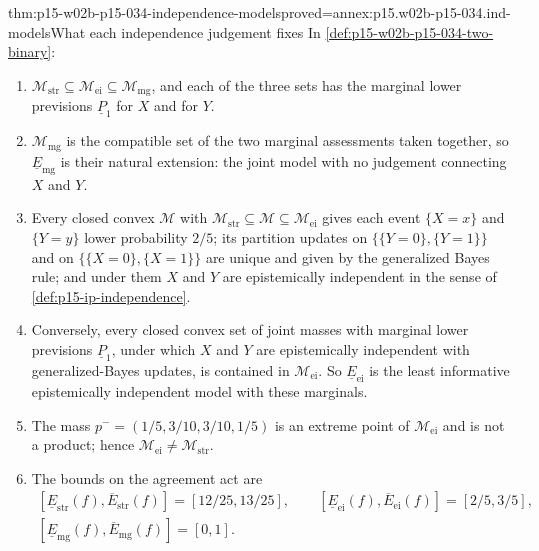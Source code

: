 \begin{hbtheorem}{thm:p15-w02b-p15-034-independence-models}{proved=annex:p15.w02b-p15-034.ind-models}{What each independence judgement fixes}
In \cref{def:p15-w02b-p15-034-two-binary}:
\begin{enumerate}
\item \(\mathcal M_{\mathrm{str}}\subseteq\mathcal M_{\mathrm{ei}}
\subseteq\mathcal M_{\mathrm{mg}}\), and each of the three sets has the
marginal lower previsions \(\underline P_1\) for \(X\) and for \(Y\).
\item \(\mathcal M_{\mathrm{mg}}\) is the compatible set of the two marginal
assessments taken together, so \(\underline E_{\mathrm{mg}}\) is their
natural extension: the joint model with no judgement connecting \(X\) and
\(Y\).
\item Every closed convex \(\mathcal M\) with
\(\mathcal M_{\mathrm{str}}\subseteq\mathcal M\subseteq\mathcal M_{\mathrm{ei}}\)
gives each event \(\{X=x\}\) and \(\{Y=y\}\) lower probability \(2/5\);
its partition updates on \(\{\{Y=0\},\{Y=1\}\}\) and on
\(\{\{X=0\},\{X=1\}\}\) are unique and given by the generalized Bayes rule;
and under them \(X\) and \(Y\) are epistemically independent in the sense
of \cref{def:p15-ip-independence}.
\item Conversely, every closed convex set of joint masses with marginal lower
previsions \(\underline P_1\), under which \(X\) and \(Y\) are
epistemically independent with generalized-Bayes updates, is contained in
\(\mathcal M_{\mathrm{ei}}\). So \(\underline E_{\mathrm{ei}}\) is the
least informative epistemically independent model with these marginals.
\item The mass \(p^-=(1/5,3/10,3/10,1/5)\) is an extreme point of
\(\mathcal M_{\mathrm{ei}}\) and is not a product; hence
\(\mathcal M_{\mathrm{ei}}\ne\mathcal M_{\mathrm{str}}\).
\item The bounds on the agreement act are
\[
\begin{gathered}
 [\underline E_{\mathrm{str}}(f),\overline E_{\mathrm{str}}(f)]=[12/25,13/25],\qquad
 [\underline E_{\mathrm{ei}}(f),\overline E_{\mathrm{ei}}(f)]=[2/5,3/5],\\
 [\underline E_{\mathrm{mg}}(f),\overline E_{\mathrm{mg}}(f)]=[0,1].
\end{gathered}
\]
\end{enumerate}
\end{hbtheorem}

